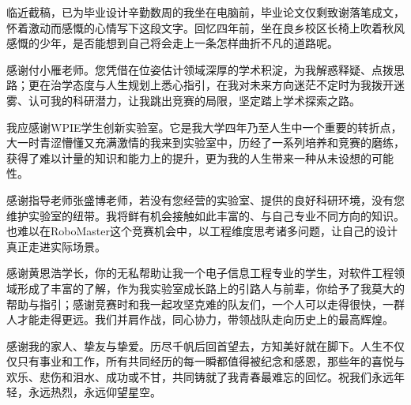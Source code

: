 \begin{acknowledgement}
临近截稿，已为毕业设计辛勤数周的我坐在电脑前，毕业论文仅剩致谢落笔成文，怀着激动而感慨的心情写下这段文字。回忆四年前，坐在良乡校区长椅上吹着秋风感慨的少年，是否能想到自己将会走上一条怎样曲折不凡的道路呢。

感谢付小雁老师。您凭借在位姿估计领域深厚的学术积淀，为我解惑释疑、点拨思路；更在治学态度与人生规划上悉心指引，在我对未来方向迷茫不定时为我拨开迷雾、认可我的科研潜力，让我跳出竞赛的局限，坚定踏上学术探索之路。

我应感谢WPIE学生创新实验室。它是我大学四年乃至人生中一个重要的转折点，大一时青涩懵懂又充满激情的我来到实验室中，历经了一系列培养和竞赛的磨练，获得了难以计量的知识和能力上的提升，更为我的人生带来一种从未设想的可能性。

感谢指导老师张盛博老师，若没有您经营的实验室、提供的良好科研环境，没有您维护实验室的纽带。我将鲜有机会接触如此丰富的、与自己专业不同方向的知识。也难以在RoboMaster这个竞赛机会中，以工程维度思考诸多问题，让自己的设计真正走进实际场景。

感谢黄恩浩学长，你的无私帮助让我一个电子信息工程专业的学生，对软件工程领域形成了丰富的了解，作为我实验室成长路上的引路人与前辈，你给予了我莫大的帮助与指引；感谢竞赛时和我一起攻坚克难的队友们，一个人可以走得很快，一群人才能走得更远。我们并肩作战，同心协力，带领战队走向历史上的最高辉煌。

感谢我的家人、挚友与挚爱。历尽千帆后回首望去，方知美好就在脚下。人生不仅仅只有事业和工作，所有共同经历的每一瞬都值得被纪念和感恩，那些年的喜悦与欢乐、悲伤和泪水、成功或不甘，共同铸就了我青春最难忘的回忆。祝我们永远年轻，永远热烈，永远仰望星空。
\end{acknowledgement}